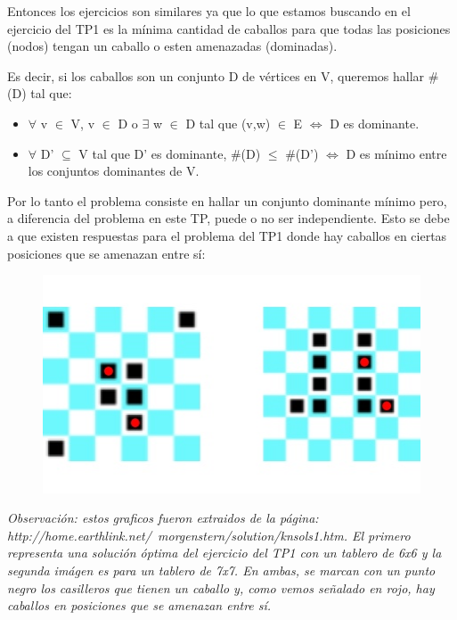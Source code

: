\medskip

Entonces los ejercicios son similares ya que lo que estamos buscando en el ejercicio del TP1 es la mínima cantidad de caballos para que todas las posiciones (nodos) tengan un caballo o esten amenazadas (dominadas).

Es decir, si los caballos son un conjunto D de vértices en V, queremos hallar \#(D) tal que:
\begin{itemize}
\item $\forall$ v $\in$ V, v $\in$ D o $\exists$ w $\in$ D tal que (v,w) $\in$ E $\iff$ D es dominante.
\item $\forall$ D' $\subseteq$ V tal que D' es dominante, \#(D) $\leq$ \#(D') $\iff$ D es mínimo entre los conjuntos dominantes de V.
\end{itemize}

Por lo tanto el problema consiste en hallar un conjunto dominante mínimo pero, a diferencia del problema en este TP, puede o no ser independiente.
Esto se debe a que existen respuestas para el problema del TP1 donde hay caballos en ciertas posiciones que se amenazan entre sí:

\begin{figure}[h]
\begin{center}
\includegraphics[scale=0.5]{imagenes/grafos-ej1-tp3-3.jpg}
\end{center}
\end{figure}

\textit{Observación: estos graficos fueron extraidos de la página: http://home.earthlink.net/~morgenstern/solution/knsols1.htm. El primero representa una solución óptima del ejercicio del TP1 con un tablero de 6x6 y la segunda imágen es para un tablero de 7x7. En ambas, se marcan con un punto negro los casilleros que tienen un caballo y, como vemos señalado en rojo, hay caballos en posiciones que se amenazan entre sí.}

